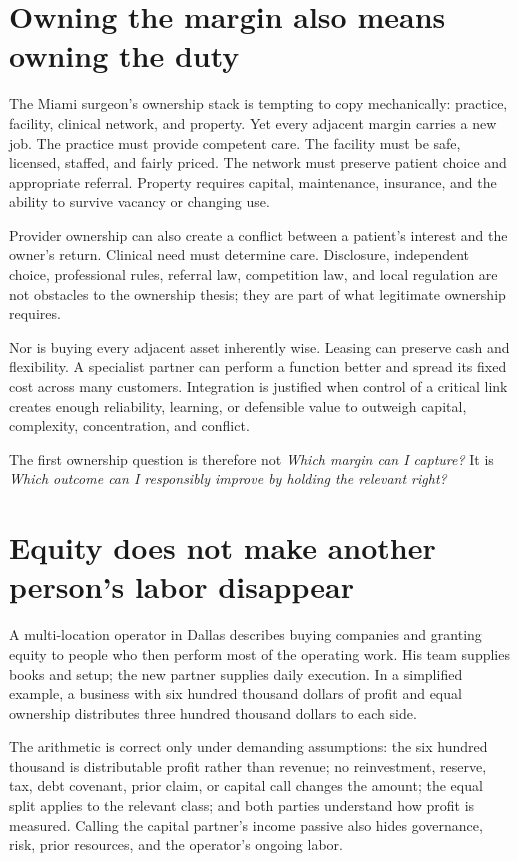 \section{Owning the margin also means owning the duty}

The Miami surgeon's ownership stack is tempting to copy mechanically: practice,
facility, clinical network, and property. Yet every adjacent margin carries a
new job. The practice must provide competent care. The facility must be safe,
licensed, staffed, and fairly priced. The network must preserve patient choice
and appropriate referral. Property requires capital, maintenance, insurance,
and the ability to survive vacancy or changing use.

Provider ownership can also create a conflict between a patient's interest and
the owner's return. Clinical need must determine care. Disclosure, independent
choice, professional rules, referral law, competition law, and local regulation
are not obstacles to the ownership thesis; they are part of what legitimate
ownership requires.

Nor is buying every adjacent asset inherently wise. Leasing can preserve cash
and flexibility. A specialist partner can perform a function better and spread
its fixed cost across many customers. Integration is justified when control of
a critical link creates enough reliability, learning, or defensible value to
outweigh capital, complexity, concentration, and conflict.

The first ownership question is therefore not \emph{Which margin can I capture?}
It is \emph{Which outcome can I responsibly improve by holding the relevant
right?}

\section{Equity does not make another person's labor disappear}

A multi-location operator in Dallas describes buying companies and granting
equity to people who then perform most of the operating work. His team supplies
books and setup; the new partner supplies daily execution. In a simplified
example, a business with six hundred thousand dollars of profit and equal
ownership distributes three hundred thousand dollars to each side.

The arithmetic is correct only under demanding assumptions: the six hundred
thousand is distributable profit rather than revenue; no reinvestment, reserve,
tax, debt covenant, prior claim, or capital call changes the amount; the equal
split applies to the relevant class; and both parties understand how profit is
measured. Calling the capital partner's income passive also hides governance,
risk, prior resources, and the operator's ongoing labor.

